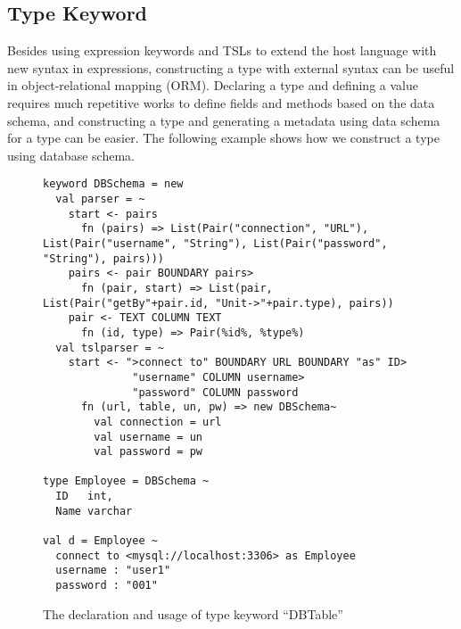 \documentclass{sig-alternate}
\begin{document}
\subsection{Type Keyword}
Besides using expression keywords and TSLs to extend the host language with new syntax in expressions, constructing a type with external syntax can be useful in object-relational mapping (ORM). Declaring a type and defining a value requires much repetitive works to define fields and methods based on the data schema, and constructing a type and generating a metadata using data schema for a type can be easier. The following example shows how we construct a type using database schema.
\begin{figure}[ht]
\begin{lstlisting}[style=wyvern]
keyword DBSchema = new
  val parser = ~
    start <- pairs
      fn (pairs) => List(Pair("connection", "URL"), List(Pair("username", "String"), List(Pair("password", "String"), pairs)))
    pairs <- pair BOUNDARY pairs>
      fn (pair, start) => List(pair, List(Pair("getBy"+pair.id, "Unit->"+pair.type), pairs))
    pair <- TEXT COLUMN TEXT
      fn (id, type) => Pair(%id%, %type%)
  val tslparser = ~
    start <- ">connect to" BOUNDARY URL BOUNDARY "as" ID> 
              "username" COLUMN username> 
              "password" COLUMN password
      fn (url, table, un, pw) => new DBSchema~
        val connection = url
        val username = un
        val password = pw

type Employee = DBSchema ~
  ID   int,
  Name varchar

val d = Employee ~
  connect to <mysql://localhost:3306> as Employee
  username : "user1"
  password : "001"
\end{lstlisting}
\vspace{-8px}
\caption{The declaration and usage of type keyword ``DBTable''}
\vspace{-10px}
\label{typekw-example-1}
\end{figure}
\end{document}
